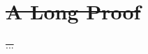 \documentclass[12pt,american]{report}
\providecommand{\DIFdeltex}[1]{{\protect\color{red}\sout{#1}}}                      %
\providecommand{\DIFdelbegin}{} %
\providecommand{\DIFdelend}{} %
\providecommand{\DIFdel}[1]{\texorpdfstring{\DIFdeltex{#1}}{}} %
\newcommand{\DIFscaledelfig}{0.5}
\newlength{\DIFdelgraphicswidth} %
\newlength{\DIFdelgraphicsheight} %
\newcommand{\DIFdelincludegraphics}[2][]{%
\sbox{\DIFdelgraphicsbox}{\DIFOincludegraphics[#1]{#2}}%
\settoboxwidth{\DIFdelgraphicswidth}{\DIFdelgraphicsbox} %
\settoboxtotalheight{\DIFdelgraphicsheight}{\DIFdelgraphicsbox} %
\scalebox{\DIFscaledelfig}{%
\parbox[b]{\DIFdelgraphicswidth}{\usebox{\DIFdelgraphicsbox}\\[-\baselineskip] \rule{\DIFdelgraphicswidth}{0em}}\llap{\resizebox{\DIFdelgraphicswidth}{\DIFdelgraphicsheight}{%
\setlength{\unitlength}{\DIFdelgraphicswidth}%
\begin{picture}(1,1)%
\thicklines\linethickness{2pt} %
{\color[rgb]{1,0,0}\put(0,0){\framebox(1,1){}}}%
{\color[rgb]{1,0,0}\put(0,0){\line( 1,1){1}}}%
{\color[rgb]{1,0,0}\put(0,1){\line(1,-1){1}}}%
\end{picture}%
}\hspace*{3pt}}} %
} %
\DeclareRobustCommand{\DIFdelbegin}{\DIFOdelbegin \let\includegraphics\DIFdelincludegraphics} %
\DeclareRobustCommand{\DIFdelend}{\DIFOaddend \let\includegraphics\DIFOincludegraphics} %
\begin{document}

\begin{singlespace}

\end{singlespace}

\appendix
\DIFdelbegin \chapter{\DIFdel{A Long Proof}}
\addtocounter{chapter}{-1}%
\DIFdel{...
}\DIFdelend %
\end{document}
